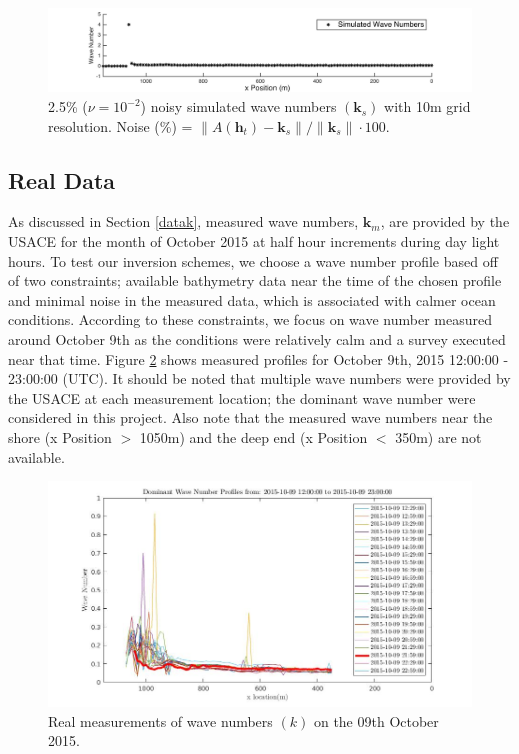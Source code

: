 \begin{figure}[H]
\center
\includegraphics[scale=0.6]{img/simulated_data_k10m.png} 
\caption{2.5\% ($\nu = 10^{-2}$) noisy simulated wave numbers $(\mathbf{k}_s)$ with 10m grid resolution. Noise (\%) = $\|A(\mathbf{h}_t) -  \mathbf{k}_s\| / \|  \mathbf{k}_s \| \cdot 100$. }
\label{Simulated10m}
\end{figure}


\subsection{Real Data}\label{realData}

As discussed in Section \ref{datak}, measured wave numbers, $\mathbf{k}_m$, are provided by the USACE for the month of October 2015 at half hour increments during day light hours. To test our inversion schemes, we choose a wave number profile based off of two constraints; available bathymetry data near the time of the chosen profile and minimal noise in the measured data, which is associated with calmer ocean conditions. According to these constraints, we focus on wave number measured around October 9th as the conditions were relatively calm and a survey executed near that time. Figure \ref{RealData_oct09} shows measured profiles for October 9th, 2015 12:00:00 - 23:00:00 (UTC). It should be noted that multiple wave numbers were provided by the USACE at each measurement location; the dominant wave number were considered in this project. Also note that the measured wave numbers near the shore (x Position $>$ 1050m) and the deep end (x Position $<$ 350m) are not available.


\begin{figure}[H]
\center
\includegraphics[scale=0.5]{img/Real_k_data.jpg} 
\caption{Real measurements of wave numbers $(k)$ on the 09th October 2015.}
\label{RealData_oct09}
\end{figure}

